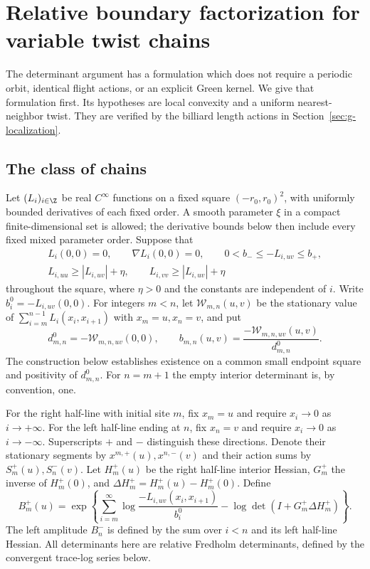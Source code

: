 \section{Relative boundary factorization for variable twist chains}
\label{sec:v5-chains}
The determinant argument has a formulation which does not require a
periodic orbit, identical flight actions, or an explicit Green kernel.
We give that formulation first. Its hypotheses are local convexity and
a uniform nearest-neighbor twist. They are verified by the billiard
length actions in Section~\ref{sec:g-localization}.

\subsection{The class of chains}
Let $(L_i)_{i\in\Z}$ be real $C^\infty$ functions on a fixed square
$(-r_0,r_0)^2$, with uniformly bounded derivatives of each fixed order.
A smooth parameter $\xi$ in a compact finite-dimensional set is allowed;
the derivative bounds below then include every fixed mixed parameter
order. Suppose that
\begin{equation}\label{eq:v5-chain-hypotheses}
 \begin{gathered}
 L_i(0,0)=0,\qquad \nabla L_i(0,0)=0,\qquad
 0<b_-\le -L_{i,uv}\le b_+,\\
 L_{i,uu}\ge |L_{i,uv}|+\eta,\qquad
 L_{i,vv}\ge |L_{i,uv}|+\eta
 \end{gathered}
\end{equation}
throughout the square, where $\eta>0$ and the constants are independent
of $i$. Write $b_i^0=-L_{i,uv}(0,0)$. For integers $m<n$, let
$\mathcal W_{m,n}(u,v)$ be the stationary value of
$\sum_{i=m}^{n-1}L_i(x_i,x_{i+1})$ with $x_m=u,x_n=v$, and put
\begin{equation}\label{eq:v5-chain-twist}
 d^0_{m,n}=-\mathcal W_{m,n,uv}(0,0),\qquad
 b_{m,n}(u,v)=\frac{-\mathcal W_{m,n,uv}(u,v)}{d^0_{m,n}}.
\end{equation}
The construction below establishes existence on a common small endpoint
square and positivity of $d^0_{m,n}$. For $n=m+1$ the empty interior
determinant is, by convention, one.

For the right half-line with initial site $m$, fix $x_m=u$ and require
$x_i\to0$ as $i\to+\infty$. For the left half-line ending at $n$, fix
$x_n=v$ and require $x_i\to0$ as $i\to-\infty$. Superscripts $+$ and
$-$ distinguish these directions. Denote their stationary segments by
$x^{m,+}(u),x^{n,-}(v)$ and their action sums by $S_m^+(u),S_n^-(v)$.
Let $H_m^+(u)$ be the right half-line interior Hessian, $G_m^+$ the
inverse of $H_m^+(0)$, and $\Delta H_m^+=H_m^+(u)-H_m^+(0)$.
Define
\begin{equation}\label{eq:v5-chain-boundary-amplitude}
 B_m^+(u)=\exp\left\{
 \sum_{i=m}^\infty\log\frac{-L_{i,uv}(x_i,x_{i+1})}{b_i^0}
 -\log\det(I+G_m^+\Delta H_m^+)\right\}.
\end{equation}
The left amplitude $B_n^-$ is defined by the sum over $i<n$ and its
left half-line Hessian. All determinants here are relative Fredholm
determinants, defined by the convergent trace-log series below.

